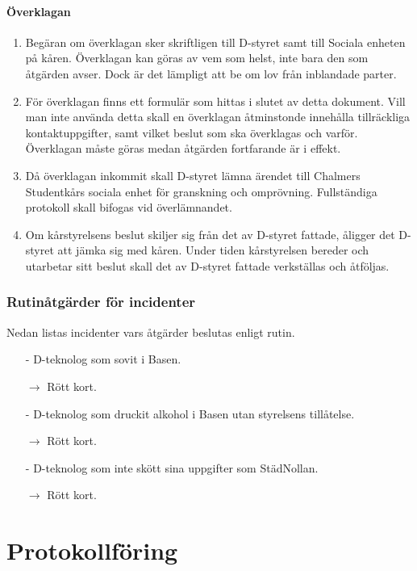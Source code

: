 \documentclass{dtek}
\begin{document}
\paragraph{Överklagan}
\begin{enumerate}[resume]
  \item Begäran om överklagan sker skriftligen till D-styret samt till Sociala enheten på kåren. Överklagan kan göras av vem som helst, inte bara den som åtgärden avser. Dock är det lämpligt att be om lov från inblandade parter.
  \item För överklagan finns ett formulär som hittas i slutet av detta dokument. Vill man inte använda detta skall en överklagan åtminstonde innehålla tillräckliga kontaktuppgifter, samt vilket beslut som ska överklagas och varför. Överklagan måste göras medan åtgärden fortfarande är i effekt.
  \item Då överklagan inkommit skall D-styret lämna ärendet till Chalmers Studentkårs sociala enhet för granskning och omprövning. Fullständiga protokoll skall bifogas vid överlämnandet.
  \item Om kårstyrelsens beslut skiljer sig från det av D-styret fattade, åligger det D-styret att jämka sig med kåren. Under tiden kårstyrelsen bereder och utarbetar sitt beslut skall det av D-styret fattade verkställas och åtföljas.
\end{enumerate}

\subsubsection{Rutinåtgärder för incidenter}
\label{subsubsec:rutinatgarder}

Nedan listas incidenter vars åtgärder beslutas enligt rutin.

\begin{itemize}
  \item[-] D-teknolog som sovit i Basen.
  \item[$\rightarrow$] Rött kort.
  \item[-] D-teknolog som druckit alkohol i Basen utan styrelsens tillåtelse.
  \item[$\rightarrow$] Rött kort.
  \item[-] D-teknolog som inte skött sina uppgifter som StädNollan.
  \item[$\rightarrow$] Rött kort.
\end{itemize}

\section{Protokollföring}
\end{document}
